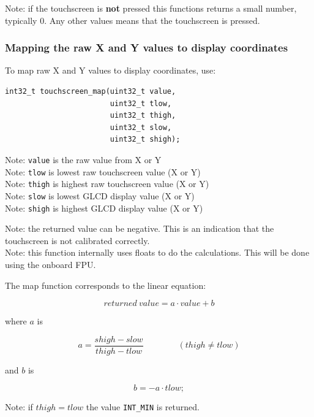\documentclass[12pt]{article}
\newcommand{\ifunc}[1]{\index{\texttt{#1}}}
\begin{document}
Note: if the touchscreen is \textbf{not} pressed this functions returns a small number, typically 0. Any other values means that the touchscreen is pressed.

\subsubsection{Mapping the raw X and Y values to display coordinates}
\ifunc{touchscreen\_map}
To map raw X and Y values to display coordinates, use:

\begin{lstlisting}
int32_t touchscreen_map(uint32_t value,
                        uint32_t tlow,
                        uint32_t thigh,
                        uint32_t slow,
                        uint32_t shigh);
\end{lstlisting}

Note: \lstinline|value| is the raw value from X or Y\\
Note: \lstinline|tlow| is lowest raw touchscreen value (X or Y)\\
Note: \lstinline|thigh| is highest raw touchscreen value (X or Y)\\
Note: \lstinline|slow| is lowest GLCD display value (X or Y)\\
Note: \lstinline|shigh| is highest GLCD display value (X or Y)

Note: the returned value can be negative. This is an indication that the touchscreen is not calibrated correctly.\\
Note: this function internally uses floats to do the calculations. This will be done using the onboard FPU.

The map function corresponds to the linear equation:

\begin{equation}
returned\ value = a\cdot value + b
\end{equation}

where $a$ is

\begin{equation}
a = \frac{shigh-slow}{thigh-tlow}\qquad\qquad(thigh \neq tlow)
\end{equation}

and $b$ is

\begin{equation}
b = - a\cdot tlow;
\end{equation}

Note: if $thigh = tlow$ the value \lstinline|INT_MIN| is returned.
\end{document}
